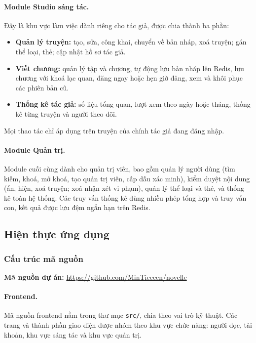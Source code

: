 \paragraph{Module Studio sáng tác.} Đây là khu vực làm việc dành riêng cho tác giả, được chia thành ba phần:
\begin{itemize}
    \item \textbf{Quản lý truyện:} tạo, sửa, công khai, chuyển về bản nháp, xoá truyện; gán thể loại, thẻ; cập nhật hồ sơ tác giả.
    \item \textbf{Viết chương:} quản lý tập và chương, tự động lưu bản nháp lên Redis, lưu chương với khoá lạc quan, đăng ngay hoặc hẹn giờ đăng, xem và khôi phục các phiên bản cũ.
    \item \textbf{Thống kê tác giả:} số liệu tổng quan, lượt xem theo ngày hoặc tháng, thống kê từng truyện và người theo dõi.
\end{itemize}
Mọi thao tác chỉ áp dụng trên truyện của chính tác giả đang đăng nhập.

\paragraph{Module Quản trị.} Module cuối cùng dành cho quản trị viên, bao gồm quản lý người dùng (tìm kiếm, khoá, mở khoá, tạo quản trị viên, cấp dấu xác minh), kiểm duyệt nội dung (ẩn, hiện, xoá truyện; xoá nhận xét vi phạm), quản lý thể loại và thẻ, và thống kê toàn hệ thống. Các truy vấn thống kê dùng nhiều phép tổng hợp và truy vấn con, kết quả được lưu đệm ngắn hạn trên Redis.

\subsection{Hiện thực ứng dụng}
\label{subsec:implementation}

\subsubsection{Cấu trúc mã nguồn}
\label{subsubsec:source-structure}

\begin{tcolorbox}[colback=blue!6, colframe=blue!60!black, boxrule=0.8pt, arc=2mm, left=4mm, right=4mm, top=2mm, bottom=2mm]
\textbf{Mã nguồn dự án:} \url{https://github.com/MinTieeeen/novelle}
\end{tcolorbox}

\paragraph{Frontend.} Mã nguồn frontend nằm trong thư mục \texttt{src/}, chia theo vai trò kỹ thuật. Các trang và thành phần giao diện được nhóm theo khu vực chức năng: người đọc, tài khoản, khu vực sáng tác và khu vực quản trị.

